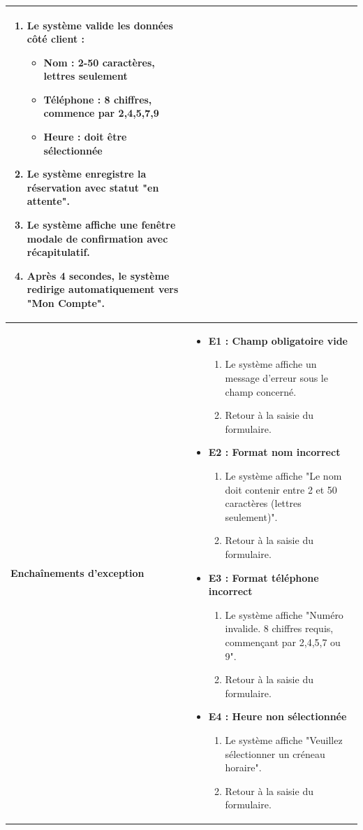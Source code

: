 \begin{longtable}{|p{6cm}|p{10cm}|}
\begin{enumerate}
\item Le système valide les données côté client :
  \begin{itemize}
  \item Nom : 2-50 caractères, lettres seulement
  \item Téléphone : 8 chiffres, commence par 2,4,5,7,9
  \item Heure : doit être sélectionnée
  \end{itemize}
\item Le système enregistre la réservation avec statut "en attente".
\item Le système affiche une fenêtre modale de confirmation avec récapitulatif.
\item Après 4 secondes, le système redirige automatiquement vers "Mon Compte".
\end{enumerate} \\ 
\hline
\rule{0pt}{12pt} \textbf{Enchaînements d'exception} & \rule{0pt}{8pt}
\begin{itemize}
\setlength{\itemsep}{3pt}
\item \textbf{E1 : Champ obligatoire vide}
\begin{enumerate}
\item Le système affiche un message d'erreur sous le champ concerné.
\item Retour à la saisie du formulaire.
\end{enumerate}
\item \textbf{E2 : Format nom incorrect}
\begin{enumerate}
\item Le système affiche "Le nom doit contenir entre 2 et 50 caractères (lettres seulement)".
\item Retour à la saisie du formulaire.
\end{enumerate}
\item \textbf{E3 : Format téléphone incorrect}
\begin{enumerate}
\item Le système affiche "Numéro invalide. 8 chiffres requis, commençant par 2,4,5,7 ou 9".
\item Retour à la saisie du formulaire.
\end{enumerate}
\item \textbf{E4 : Heure non sélectionnée}
\begin{enumerate}
\item Le système affiche "Veuillez sélectionner un créneau horaire".
\item Retour à la saisie du formulaire.

\end{enumerate}
\end{itemize}
\end{longtable}
